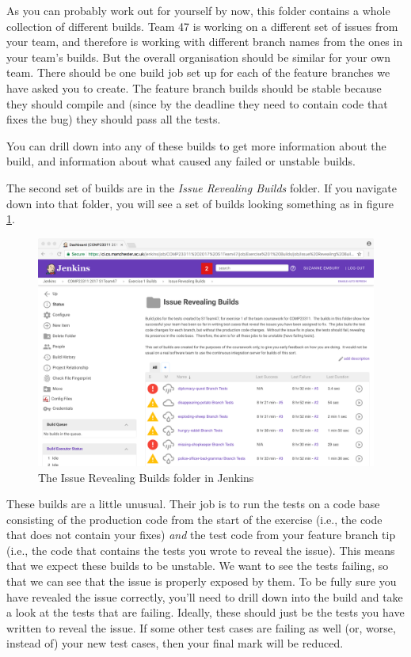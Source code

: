 \documentclass[
]{book}
\begin{document}
As you can probably work out for yourself by now, this folder contains a whole collection of different builds. Team 47 is working on a different set of issues from your team, and therefore is working with different branch names from the ones in your team's builds. But the overall organisation should be similar for your own team. There should be one build job set up for each of the feature branches we have asked you to create. The feature branch builds should be stable because they should compile and (since by the deadline they need to contain code that fixes the bug) they should pass all the tests.

You can drill down into any of these builds to get more information about the build, and information about what caused any failed or unstable builds.

The second set of builds are in the \emph{Issue Revealing Builds} folder. If you navigate down into that folder, you will see a set of builds looking something as in figure \ref{fig:IssueRevealingBuilds-fig}.

\begin{figure}

{\centering \includegraphics[width=1\linewidth]{images/IssueRevealingBuilds} 

}

\caption{The Issue Revealing Builds folder in Jenkins}\label{fig:IssueRevealingBuilds-fig}
\end{figure}

These builds are a little unusual. Their job is to run the tests on a code base consisting of the production code from the start of the exercise (i.e., the code that does not contain your fixes) \emph{and} the test code from your feature branch tip (i.e., the code that contains the tests you wrote to reveal the issue). This means that we expect these builds to be unstable. We want to see the tests failing, so that we can see that the issue is properly exposed by them. To be fully sure you have revealed the issue correctly, you'll need to drill down into the build and take a look at the tests that are failing. Ideally, these should just be the tests you have written to reveal the issue. If some other test cases are failing as well (or, worse, instead of) your new test cases, then your final mark will be reduced.
\end{document}
